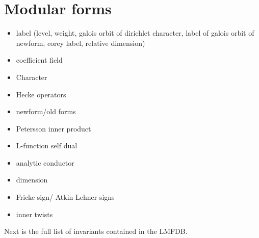 
\section{Modular forms}

\begin{itemize}
    \item label (level, weight, galois orbit of dirichlet character, label of galois orbit of newform, corey label, relative dimension)
    \item coefficient field
    \item Character
    \item Hecke operators
    \item newform/old forms
    \item Petersson inner product
    \item L-function self dual
    \item analytic conductor
    \item dimension
    \item Fricke sign/ Atkin-Lehner signs
    \item inner twists
\end{itemize}

Next is the full list of invariants contained in the LMFDB.

